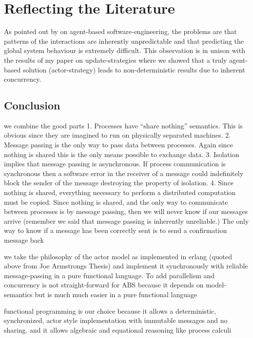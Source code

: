 \chapter{Reflecting the Literature}
\label{chap:refl}

As pointed out by \cite{jennings_agent-based_2000} on agent-based software-engineering, the problems are that patterns of the interactions are inherently unpredictable and that predicting the global system behaviour is extremely difficult. This observation is in unison with the results of my paper on update-strategies where we showed that a truly agent-based solution (actor-strategy) leads to non-deterministic results due to inherent concurrency.

\section{Conclusion}
we combine the good parts
1. Processes have “share nothing” semantics. This is obvious since they are imagined to run on physically separated machines.
2. Message passing is the only way to pass data between processes. Again since nothing is shared this is the only means possible to exchange data.
3. Isolation implies that message passing is asynchronous. If process communication is synchronous then a software error in the receiver of a message could indefinitely block the sender of the message destroying the property of isolation.
4. Since nothing is shared, everything necessary to perform a distributed computation must be copied. Since nothing is shared, and the only way to communicate between processes is by message passing, then we will never know if our messages arrive (remember we said that message passing is inherently unreliable.) The only way to know if a message has been correctly sent is to send a confirmation message back

we take the philosophy of the actor model as implemented in erlang (quoted above from Joe Armstrongs Thesis) and
implement it synchronously with reliable message-passing in a pure functional language. To add parallelism and concurrency
is not straight-forward for ABS because it depends on model-semantics but
is much much easier in a pure functional language


functional programming is our choice because it allows a deterministic, synchronized, actor style  implementation with  immutable messages and no sharing. and it allows algebraic and equational reasoning like process calculi\\

